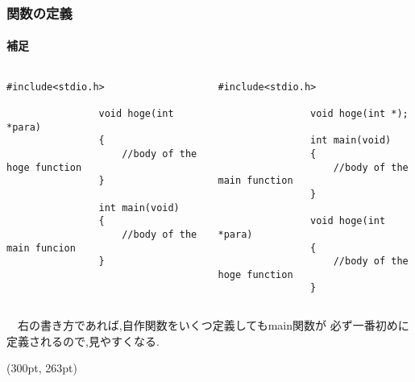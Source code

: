 \documentclass[dvipdfmx]{beamer}
\begin{document}
\begin{frame}[t, fragile, label=47]
    \frametitle{関数の定義}
    \framesubtitle{補足}
    \vspace{-30pt}
    \begin{columns}[t, totalwidth=0.98\linewidth]
        \begin{column}{.45\linewidth}
            \begin{lstlisting}[gobble=16, caption=Example\_1]
                #include<stdio.h>
                
                void hoge(int *para)
                {
                    //body of the hoge function
                }

                int main(void)
                {   
                    //body of the main funcion
                }
            \end{lstlisting}
        \end{column}
        \begin{column}{.51\linewidth}
            \begin{lstlisting}[gobble=16, caption=Example\_2]
                #include<stdio.h>

                void hoge(int *);

                int main(void)
                {
                    //body of the main function
                }

                void hoge(int *para)
                {
                    //body of the hoge function
                }
            \end{lstlisting}
        \end{column}
    \end{columns}
    　右の書き方であれば,自作関数をいくつ定義してもmain関数が
    必ず一番初めに定義されるので,見やすくなる.
    \begin{textblock*}{0.3\linewidth}(300pt, 263pt)
    \hyperlink{46}{}
    \space
    \hyperlink{48}{}
    \end{textblock*}
\end{frame}
\end{document}
